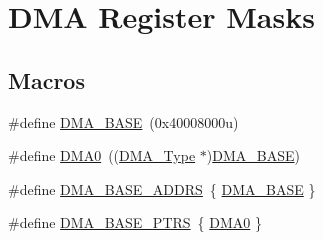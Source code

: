 \hypertarget{group___d_m_a___register___masks}{}\section{D\+MA Register Masks}
\label{group___d_m_a___register___masks}
\subsection*{Macros}
\begin{DoxyCompactItemize}
\item 
\#define \mbox{\hyperlink{group___d_m_a___register___masks_gab04dd812f37907dc8bd6ed82e346b563}{D\+M\+A\+\_\+\+B\+A\+SE}}~(0x40008000u)
\item 
\#define \mbox{\hyperlink{group___d_m_a___register___masks_ga4103044f9ca209772f513dc694513ffb}{D\+M\+A0}}~((\mbox{\hyperlink{struct_d_m_a___type}{D\+M\+A\+\_\+\+Type}} $\ast$)\mbox{\hyperlink{group___d_m_a___register___masks_gab04dd812f37907dc8bd6ed82e346b563}{D\+M\+A\+\_\+\+B\+A\+SE}})
\item 
\#define \mbox{\hyperlink{group___d_m_a___register___masks_ga3e24fb8f1e5ce6161c39aa9d8b7c4d16}{D\+M\+A\+\_\+\+B\+A\+S\+E\+\_\+\+A\+D\+D\+RS}}~\{ \mbox{\hyperlink{group___d_m_a___register___masks_gab04dd812f37907dc8bd6ed82e346b563}{D\+M\+A\+\_\+\+B\+A\+SE}} \}
\item 
\#define \mbox{\hyperlink{group___d_m_a___register___masks_gada914e90165e25ae4eeddf5175920e77}{D\+M\+A\+\_\+\+B\+A\+S\+E\+\_\+\+P\+T\+RS}}~\{ \mbox{\hyperlink{group___d_m_a___register___masks_ga4103044f9ca209772f513dc694513ffb}{D\+M\+A0}} \}
\item 

\end{DoxyCompactItemize}
